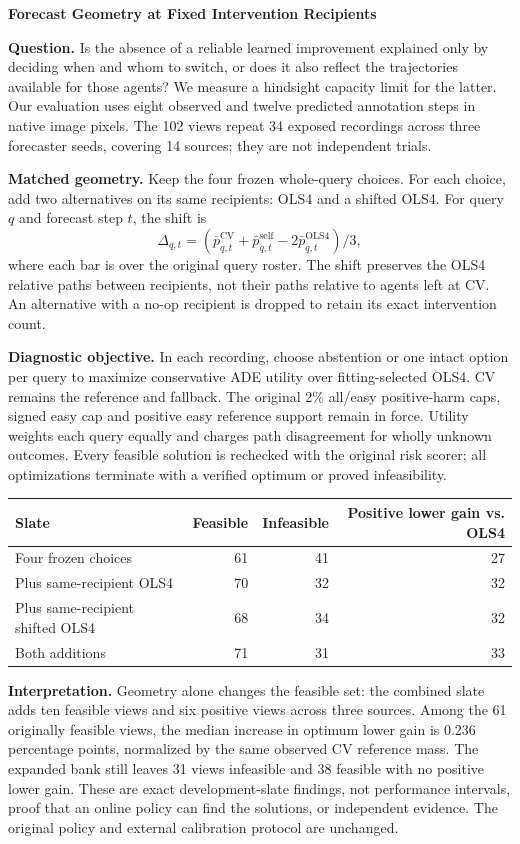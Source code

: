 \documentclass[10pt,letterpaper]{article}
\begin{document}
{\Large\bfseries Forecast Geometry at Fixed Intervention Recipients}

\textbf{Question.} Is the absence of a reliable learned improvement
explained only by deciding when and whom to switch, or does it also
reflect the trajectories available for those agents? We measure a
hindsight capacity limit for the latter. Our evaluation uses eight
observed and twelve predicted annotation steps in native image pixels.
The 102 views repeat 34 exposed recordings across three forecaster
seeds, covering 14 sources; they are not independent trials.

\textbf{Matched geometry.} Keep the four frozen whole-query choices.
For each choice, add two alternatives on its same recipients: OLS4
and a shifted OLS4. For query $q$ and forecast step $t$, the shift is
\[
  \Delta_{q,t} =
  (\bar p^{\mathrm{CV}}_{q,t} + \bar p^{\mathrm{self}}_{q,t}
    - 2\bar p^{\mathrm{OLS4}}_{q,t})/3 ,
\]
where each bar is over the original query roster. The shift preserves
the OLS4 relative paths between recipients, not their paths relative
to agents left at CV. An alternative with a no-op recipient is dropped
to retain its exact intervention count.

\textbf{Diagnostic objective.} In each recording, choose abstention
or one intact option per query to maximize conservative ADE utility
over fitting-selected OLS4. CV remains the reference and fallback.
The original 2\% all/easy positive-harm caps, signed easy cap and
positive easy reference support remain in force. Utility weights each
query equally and charges path disagreement for wholly unknown
outcomes. Every feasible solution is rechecked with the original risk
scorer; all optimizations terminate with a verified optimum or proved
infeasibility.

\begin{center}
\begin{tabular}{@{}lrrr@{}}
\toprule
Slate & Feasible & Infeasible & Positive lower gain vs. OLS4 \\
\midrule
Four frozen choices & 61 & 41 & 27 \\
Plus same-recipient OLS4 & 70 & 32 & 32 \\
Plus same-recipient shifted OLS4 & 68 & 34 & 32 \\
Both additions & 71 & 31 & 33 \\
\bottomrule
\end{tabular}
\end{center}

\textbf{Interpretation.} Geometry alone changes the feasible set: the
combined slate adds ten feasible views and six positive views across
three sources. Among the 61 originally feasible views, the median
increase in optimum lower gain is 0.236 percentage points, normalized
by the same observed CV reference mass. The expanded bank still leaves
31 views infeasible and 38 feasible with no positive lower gain. These
are exact development-slate findings, not performance intervals, proof
that an online policy can find the solutions, or independent evidence.
The original policy and external calibration protocol are unchanged.
\end{document}
